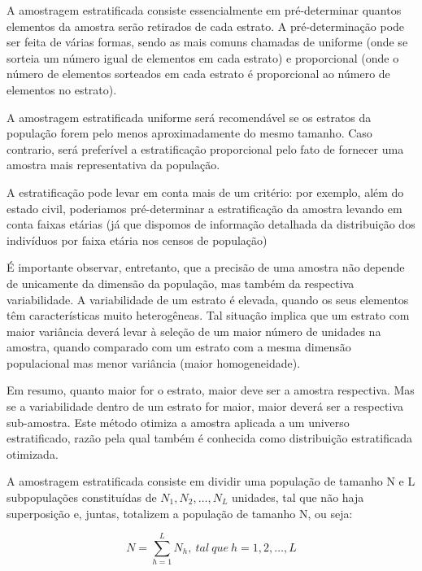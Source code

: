 A amostragem estratificada consiste essencialmente em
pré-determinar quantos elementos da amostra serão retirados de
cada estrato. A pré-determinação pode ser feita de várias formas,
sendo as mais comuns chamadas de uniforme (onde se sorteia um
número igual de elementos em cada estrato) e proporcional (onde o
número de elementos sorteados em cada estrato é proporcional ao
número de elementos no estrato).\vskip0.3cm



A amostragem estratificada uniforme será recomendável se os
estratos da população forem pelo menos aproximadamente do mesmo
tamanho. Caso contrario, será preferível a estratificação
proporcional pelo fato de fornecer uma amostra mais representativa
da população.\vskip0.3cm


A estratificação pode levar em conta mais de um critério: por
exemplo, além do estado civil, poderiamos pré-determinar a
estratificação da amostra levando em conta faixas etárias (já que
dispomos de informação detalhada da distribuição dos indivíduos
por faixa etária nos censos de população)\vskip0.3cm

É importante observar, entretanto, que a precisão de uma amostra
não depende de unicamente da dimensão da população, mas também da
respectiva variabilidade. A variabilidade de um estrato é elevada,
quando os seus elementos têm características muito heterogêneas.
Tal situação implica que um estrato com maior variância deverá
levar à seleção de um maior número de unidades na amostra, quando
comparado com um estrato com a mesma dimensão populacional mas
menor variância (maior homogeneidade).\vskip0.3cm

Em resumo, quanto maior for o estrato, maior deve ser a amostra
respectiva. Mas se a variabilidade dentro de um estrato for maior,
maior deverá ser a respectiva sub-amostra. Este método otimiza a
amostra aplicada a um universo estratificado, razão pela qual
também é conhecida como distribuição estratificada
otimizada.\vskip0.3cm



\newpage
A amostragem estratificada consiste em dividir uma população de
tamanho N e L subpopulações constituídas de
$N_{1},N_{2},\ldots,N_{L}$ unidades, tal que não haja superposição
e, juntas, totalizem a população de tamanho N, ou seja:

\begin{equation}\label{N}
    N=\sum_{h=1}^{L}N_{h}, \ tal \ que \ h=1,2,\ldots,L
\end{equation}


